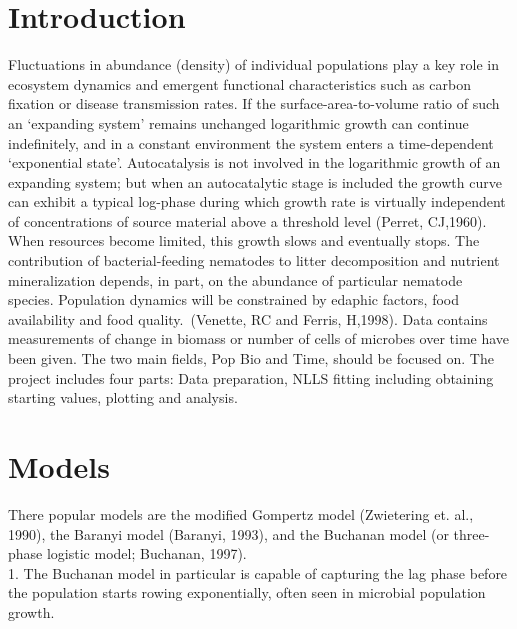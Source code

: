 \documentclass[11pt]{article}
\begin{document}
  \section{Introduction}
    Fluctuations in abundance (density) of individual populations play a key role in ecosystem dynamics and emergent functional characteristics such as carbon fixation or disease transmission rates. If the surface-area-to-volume ratio of such an ‘expanding system’ remains unchanged logarithmic growth can continue indefinitely, and in a constant environment the system enters a time-dependent ‘exponential state’. Autocatalysis is not involved in the logarithmic growth of an expanding system; but when an autocatalytic stage is included the growth curve can exhibit a typical log-phase during which growth rate is virtually independent of concentrations of source material above a threshold level (Perret, CJ,1960).  When resources become limited, this growth slows and eventually stops. The contribution of bacterial-feeding nematodes to litter decomposition and nutrient mineralization depends, in part, on the abundance of particular nematode species. Population dynamics will be constrained by edaphic factors, food availability and food quality. (Venette, RC and Ferris, H,1998). Data contains measurements of change in biomass or number of cells of microbes over time have been given.   The two main fields, Pop Bio and Time, should be focused on. The project includes four parts: Data preparation, NLLS fitting including obtaining starting values, plotting and analysis. 
  
  \section{Models}
  There popular models are the modified Gompertz model (Zwietering et. al., 1990), the Baranyi model (Baranyi, 1993), and the Buchanan model (or three-phase logistic model; Buchanan, 1997).\\ 

1.	The Buchanan model in particular is capable of capturing the lag phase before the population starts rowing exponentially, often seen in microbial population growth.
\end{document}

